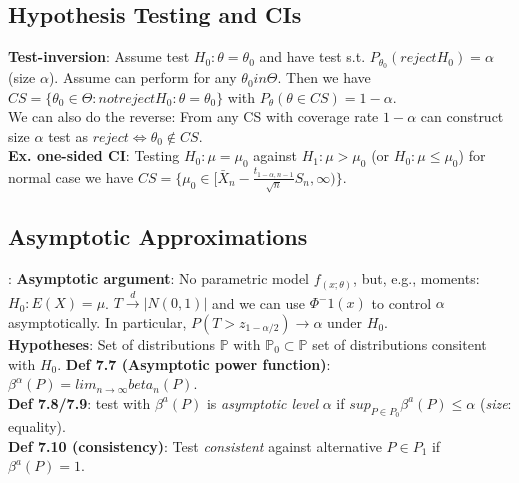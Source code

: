 \subsection{Hypothesis Testing and CIs}
\textbf{Test-inversion}: Assume test $H_0: \theta = \theta_0$ and have test s.t. $P_{\theta_0}(reject H_0) = \alpha$ (size $\alpha$). Assume can perform for any $\theta_0 in \Theta$. Then we have $CS = \{\theta_0\in\Theta: not reject H_0: \theta=\theta_0\}$ with $P_\theta(\theta\in CS) = 1-\alpha$.\\
We can also do the reverse: From any CS with coverage rate $1-\alpha$ can construct size $\alpha$ test as $reject\Leftrightarrow \theta_0\notin CS$.\\
\textbf{Ex. one-sided CI}: Testing $H_0: \mu = \mu_0$ against $H_1:\mu>\mu_0$ (or $H_0: \mu \leq \mu_0$) for normal case we have $CS = \{\mu_0 \in [\bar{X}_n - \frac{t_{1-\alpha, n-1}}{\sqrt{n}}S_n, \infty)\}$.

\subsection{Asymptotic Approximations}: 
\textbf{Asymptotic argument}: No parametric model $f_(x;\theta)$, but, e.g., moments: $H_0: E(X) = \mu$. $T\xrightarrow{d}|N(0,1)|$ and we can use $\Phi^-1(x)$ to control $\alpha$ asymptotically. In particular, $P(T>z_{1-\alpha/2})\rightarrow \alpha$ under $H_0$.\\ 
\textbf{Hypotheses}: Set of distributions $\mathbb{P}$ with $\mathbb{P}_0\subset\mathbb{P}$ set of distributions consitent with $H_0$.
\textbf{Def 7.7 (Asymptotic power function)}: $\beta^\alpha(P) = lim_{n\to\infty}beta_n(P)$.\\
\textbf{Def 7.8/7.9}: test with $\beta^a(P)$ is \emph{asymptotic level} $\alpha$ if $sup_{P\in P_0}\beta^a(P)\leq\alpha$ (\emph{size}: equality).\\
\textbf{Def 7.10 (consistency)}: Test \emph{consistent} against alternative $P\in P_1$ if $\beta^a(P) = 1$.